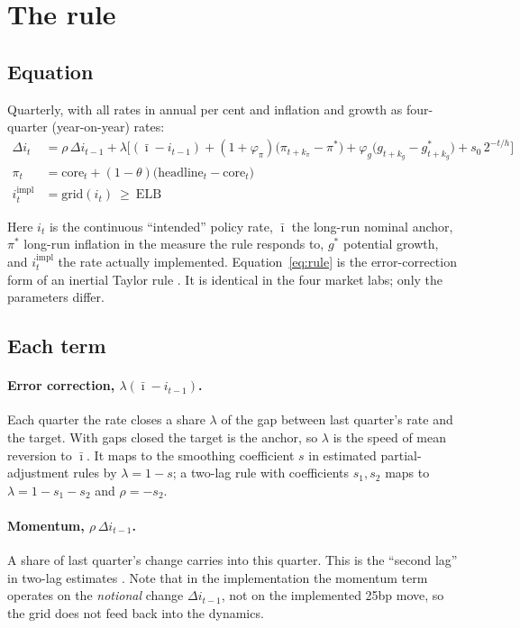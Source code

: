 \documentclass[11pt,a4paper]{article}
\newcommand{\ib}{\bar{\imath}}
\newcommand{\pis}{\pi^{*}}
\newcommand{\gs}{g^{*}}
\newcommand{\ELB}{\mathrm{ELB}}
\begin{document}
\section{The rule}
\label{sec:rule}

\subsection{Equation}

Quarterly, with all rates in annual per cent and inflation and growth as four-quarter (year-on-year) rates:
\begin{align}
\Delta i_t &= \rho\,\Delta i_{t-1}
  + \lambda\Big[(\ib - i_{t-1}) + (1+\varphi_\pi)\big(\pi_{t+k_\pi} - \pis\big)
  + \varphi_g\big(g_{t+k_g} - \gs_{t+k_g}\big) + s_0\, 2^{-t/h}\Big]
  \label{eq:rule}\\
\pi_{t} &= \mathrm{core}_{t} + (1-\theta)\big(\mathrm{headline}_{t} - \mathrm{core}_{t}\big)
  \label{eq:pi}\\
i^{\mathrm{impl}}_t &= \mathrm{grid}(i_t) \ \ge\ \ELB
  \label{eq:impl}
\end{align}

Here $i_t$ is the continuous ``intended'' policy rate, $\ib$ the long-run nominal anchor, $\pis$ long-run inflation in the measure the rule responds to, $\gs$ potential growth, and $i^{\mathrm{impl}}_t$ the rate actually implemented. Equation~\eqref{eq:rule} is the error-correction form of an inertial Taylor rule \parencite{judd1998}. It is identical in the four market labs; only the parameters differ.

\subsection{Each term}

\paragraph{Error correction, $\lambda(\ib - i_{t-1})$.}
Each quarter the rate closes a share $\lambda$ of the gap between last quarter's rate and the target. With gaps closed the target is the anchor, so $\lambda$ is the speed of mean reversion to $\ib$. It maps to the smoothing coefficient $s$ in estimated partial-adjustment rules by $\lambda = 1-s$; a two-lag rule with coefficients $s_1, s_2$ maps to $\lambda = 1 - s_1 - s_2$ and $\rho = -s_2$.

\paragraph{Momentum, $\rho\,\Delta i_{t-1}$.}
A share of last quarter's change carries into this quarter. This is the ``second lag'' in two-lag estimates \parencite{judd1998,coibion2012}. Note that in the implementation the momentum term operates on the \emph{notional} change $\Delta i_{t-1}$, not on the implemented 25bp move, so the grid does not feed back into the dynamics.
\end{document}

